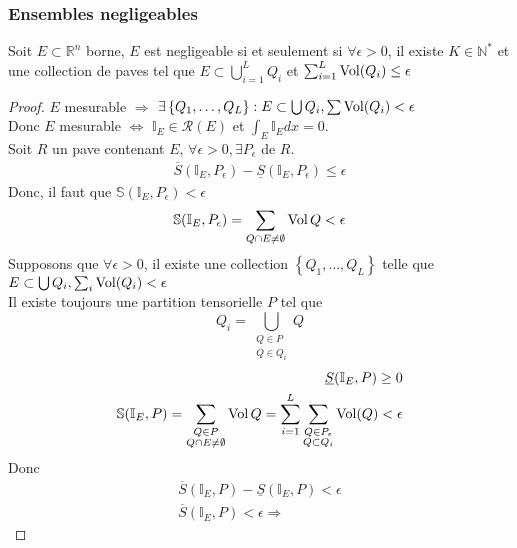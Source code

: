 \documentclass[../main.tex]{subfiles}
\begin{document}
\subsubsection*{Ensembles negligeables}
\begin{lemma}
	Soit $E \subset \mathbb{R}^n$ borne, $E$ est negligeable si et seulement si $\forall \epsilon>0$, il existe $K \in \mathbb{N}^{*}$ et une collection de paves tel que $E \subset \bigcup_{i=1} ^{L}Q_i$ et $\sum_{i=1} ^{L}\operatorname*{Vol}( Q_i) \leq  \epsilon$
\end{lemma}
\begin{proof}
	$E$ mesurable $ \Rightarrow $ $\exists \left\{ Q_1, \ldots, Q_L \right\} : E \subset \bigcup Q_i, \sum \operatorname*{Vol} ( Q_i) < \epsilon $\\
	Donc $E$ mesurable $\iff$ $ \mathbb{I}_E \in \mathcal{R}( E) $ et  $\int_E \mathbb{I}_E	dx =0$.\\
	Soit $R$ un pave contenant $E$, $\forall \epsilon>0, \exists P_\epsilon$ de $R$.\\
	\begin{align*}
		\overline{S} (  \mathbb{I}_E, P_\epsilon) - \underline { S} ( \mathbb{I}_E,P_\epsilon)  \leq \epsilon
	\end{align*}
	Donc, il faut que $\mathbb{S} ( \mathbb{I}_E, P_\epsilon)< \epsilon $
	\[ 
		\mathbb{S}(  \mathbb{I}_E, P_\epsilon) 	= \sum_{ Q \cap E\neq \emptyset}  \operatorname*{Vol} Q < \epsilon
	\]
	Supposons que $\forall \epsilon >0$, il existe une collection $ \left\{ Q_1, \ldots, Q_L \right\} $ telle que $E \subset \bigcup Q_i, \sum_i \operatorname*{Vol} ( Q_i) < \epsilon$\\
	Il existe toujours une partition tensorielle $P$ tel que
	\[ 
	Q_i = \bigcup _{\substack {  Q \in P\\ Q \in Q_i} } Q
	\]
	\begin{align*}
		\underline { S} ( \mathbb{I}_E, P) \geq 0\\
		\mathbb{S}(  \mathbb{I}_E, P) = \sum_{\substack{ Q \in P\\Q \cap E \neq \emptyset }} \operatorname*{Vol} Q = \sum_{i=1}^{ L} \sum _{ \substack { Q \in P_\epsilon\\ Q \subset Q_i} } \operatorname*{Vol} ( Q) < \epsilon
	\end{align*}
Donc
\begin{align*}
	\overline{S}( \mathbb{I}_E, P) - \underline { S} ( \mathbb{I}_E, P) < \epsilon\\
	\overline{S}( \mathbb{I}_E, P)  < \epsilon
	\Rightarrow 
\end{align*}

	
\end{proof}
\end{document}
